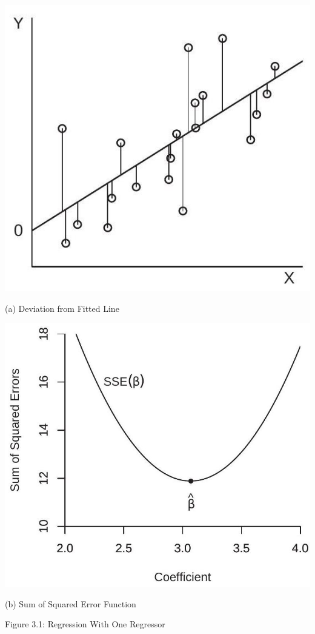 \documentclass[10pt]{article}
\begin{document}
\includegraphics[max width=\textwidth]{2022_09_17_333a3ece3fb3afcc15d0g-05}

(a) Deviation from Fitted Line

\includegraphics[max width=\textwidth]{2022_09_17_333a3ece3fb3afcc15d0g-05(1)}

(b) Sum of Squared Error Function

Figure 3.1: Regression With One Regressor
\end{document}
